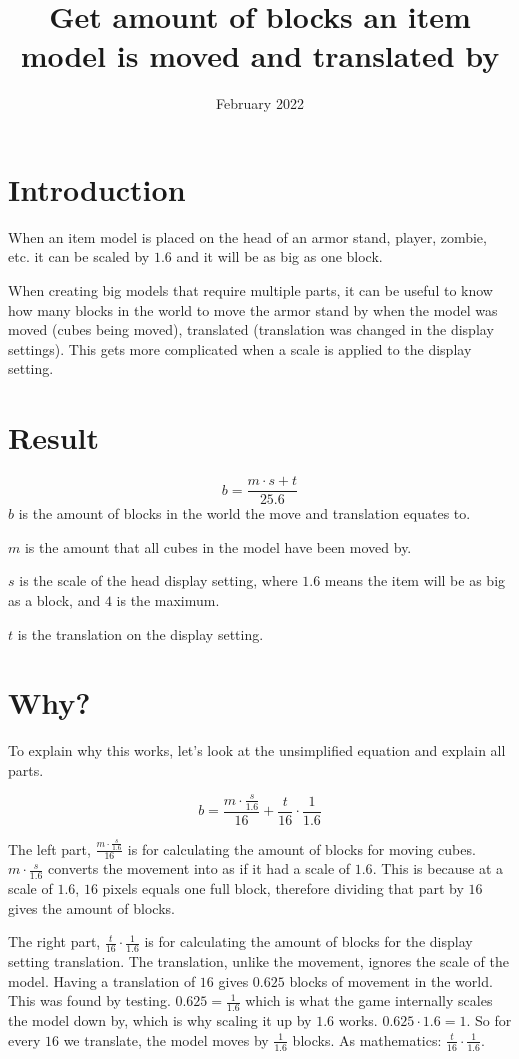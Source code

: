 \documentclass{article}
\title{Get amount of blocks an item model is moved and translated by}
\date{February 2022}
\begin{document}
\maketitle

\section{Introduction}
When an item model is placed on the head of an armor stand, player, zombie, etc. it can be scaled by $1.6$ and it will be as big as one block.

When creating big models that require multiple parts, it can be useful to know how many blocks in the world to move the armor stand by when the model was moved (cubes being moved), translated (translation was changed in the display settings). This gets more complicated when a scale is applied to the display setting.

\section{Result}
$$b=\frac{m\cdot s+t}{25.6}$$
$b$ is the amount of blocks in the world the move and translation equates to.

$m$ is the amount that all cubes in the model have been moved by.

$s$ is the scale of the head display setting, where $1.6$ means the item will be as big as a block, and $4$ is the maximum.

$t$ is the translation on the display setting.

\section{Why?}
To explain why this works, let's look at the unsimplified equation and explain all parts.

$$b=\frac{m\cdot \frac{s}{1.6}}{16}+\frac{t}{16}\cdot \frac{1}{1.6}$$

The left part, $\frac{m\cdot \frac{s}{1.6}}{16}$ is for calculating the amount of blocks for moving cubes. $m\cdot \frac{s}{1.6}$ converts the movement into as if it had a scale of $1.6$. This is because at a scale of $1.6$, $16$ pixels equals one full block, therefore dividing that part by $16$ gives the amount of blocks.

The right part, $\frac{t}{16}\cdot \frac{1}{1.6}$ is for calculating the amount of blocks for the display setting translation. The translation, unlike the movement, ignores the scale of the model. Having a translation of $16$ gives $0.625$ blocks of movement in the world. This was found by testing. $0.625=\frac{1}{1.6}$ which is what the game internally scales the model down by, which is why scaling it up by $1.6$ works. $0.625\cdot 1.6=1$. So for every $16$ we translate, the model moves by $\frac{1}{1.6}$ blocks. As mathematics: $\frac{t}{16}\cdot \frac{1}{1.6}$.
\end{document}
